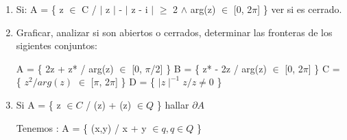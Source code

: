 \documentclass[a4paper,12pt]{article}
\begin{document}
\begin{enumerate}
a \(\in\) A (abierto) \(\Rightarrow\) existe r \(>\) 0 / V(a, r) \(\subset\) A

por ver que V(p, r) \(\subset\) B

\(\omega \in\) V(p, r) \(\Rightarrow\) \(\mid\) p - \(\omega\) \(\mid\) \(<\) r

\(\mid\) 1 + i - a - \(\omega\) \(\mid\) \(<\) r

\(\mid\) (1 + i - \(\omega\)) - a \(\mid\) \(<\) r \(\Rightarrow\) 1 + i - \(\omega\) \(\in\) A

Ahora, si tomamos un a1 \(\in\) A \(\Rightarrow\) 1 + i - \(\omega\) = a1

\(\omega\) = 1 + i - a1 \(\in\) B

\(\Rightarrow\) V(p, r) \(\subset\) B

\(\Rightarrow\) existe r \(>\) 0 / V(p*, r) \(\subset\) B*

veamos que : V(p, r) \(\subset\) B


\(\omega \in\) V(p, r) \(\Rightarrow\) \(\mid\) \(\omega\) - p \(\mid\) \(<\) r

\(\Rightarrow\) \(\mid\) \(\omega\)* - p* \(\mid\) \(<\) r

\(\Rightarrow\) \(\omega\) \(\in\) V(b, r2) \(\subset\) B

\(\exists\) b1 \(\in\) B / \(\omega\) - a = b1

\(\omega\) = a + b1

\(\omega\) \(\in\) A + B

   \item Si:
   A = \{ z \(\in\) C / \(\mid\) z \(\mid\) - \(\mid\) z - i \(\mid\) \(\geq\) 2 \(\wedge\) arg(z) \(\in\) [0, 2\(\pi\)] \}
ver si es cerrado.

    \item Graficar, analizar si son abiertos o cerrados, determinar las fronteras de los
sigientes conjuntos:


A = \{ 2z + z* / arg(z) \(\in\) [0, \(\pi\)/2] \} \newline
B = \{ z* - 2z / arg(z) \(\in\) [0, 2\(\pi\)] \} \newline
C = \{ $z^2 / arg(z)$ \(\in\) [\(\pi\), 2\(\pi\)] \} \newline
D = \{ $\mid z \mid^{-1} z / z \neq 0$ \}

   \item Si A = \{ z $\in C$ / (z) + (z) $\in Q$ \} hallar \(\partial A\)

Tenemos : A = \{ (x,y) / x + y $\in q, q \in Q$ \}


\end{enumerate}
\end{document}

